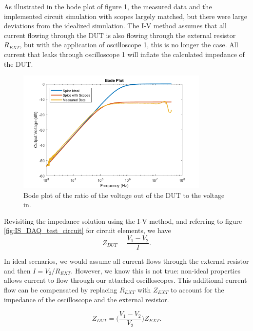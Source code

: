 \par As illustrated in the bode plot of figure \ref{fig:test_circuit_bode}, the measured data and the implemented circuit simulation with scopes largely matched, but there were large deviations from the idealized simulation. The I-V method assumes that all current flowing through the DUT is also flowing through the external resistor $R_{EXT}$, but with the application of oscilloscope 1, this is no longer the case. All current that leaks through oscilloscope 1 will inflate the calculated impedance of the DUT.  

\begin{figure}[h]
    \centering
    \includegraphics[width=0.85\textwidth]{images/spice-measured-comp.png}
    \caption{Bode plot of the ratio of the voltage out of the DUT to the voltage in.}
    \label{fig:test_circuit_bode}
\end{figure}

\par Revisiting the impedance solution using the I-V method, and referring to figure \ref{fig:IS_DAQ_test_circuit} for circuit elements, we have
\begin{equation}
    Z_{DUT} = \frac{V_1 - V_2}{I}.
\end{equation}

\noindent In ideal scenarios, we would assume all current flows through the external resistor and then $I = V_2 / R_{EXT}$. However, we know this is not true: non-ideal properties allows current to flow through our attached oscilloscopes. This additional current flow can be compensated by replacing $R_{EXT}$ with $Z_{EXT}$ to account for the impedance of the oscilloscope and the external resistor. 

\begin{equation}
    Z_{DUT} = \bigg(\frac{V_1 - V_2}{V_2}\bigg)Z_{EXT}.
    \label{eqn:corrected_IV}
\end{equation}

